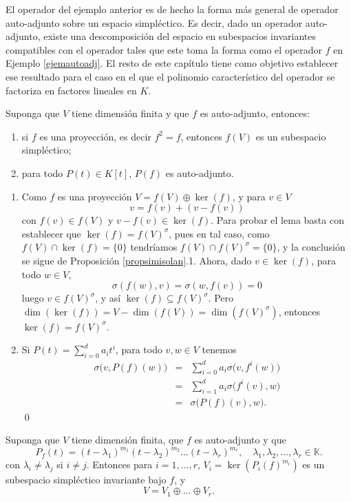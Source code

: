 \begin{obs}
El operador del ejemplo anterior es de hecho la forma m\'as general de operador auto-adjunto sobre un espacio simpl\'ectico. Es decir, dado un operador auto-adjunto, existe una descomposici\'on del espacio en subespacios invariantes compatibles con el operador tales que este toma la forma como el operador $f$ en Ejemplo \ref{ejemautoadj}. El resto de este cap\'itulo tiene como objetivo establecer ese resultado para el caso en el que el polinomio caracter\'istico del operador se factoriza en factores lineales en $K$.
\end{obs}

\begin{lema}
Suponga que $V$ tiene dimensi\'on finita y que $f$ es auto-adjunto, entonces:
\begin{enumerate}
\item si $f$ es una proyecci\'on, es decir $f^2=f$, entonces $f(V)$ es un subespacio simpl\'ectico;
\item para todo $P(t)\in K[t]$, $P(f)$ es auto-adjunto.
\end{enumerate}
\end{lema}

\dem 
\begin{enumerate}
\item Como $f$ es una proyecci\'on $V=f(V)\oplus\ker(f)$, y para $v\in V$
\[
v=f(v)+(v-f(v))
\]
con $f(v)\in f(V)$ y $v-f(v)\in\ker(f)$. Para probar el lema basta con establecer que $\ker(f)=f(V)^\sigma$, pues en tal caso, como $f(V)\cap\ker(f)=\{0\}$ tendr\'iamos $f(V)\cap f(V)^\sigma=\{0\}$, y la conclusi\'on se sigue de Proposici\'on \ref{propsimisolan}.1. Ahora, dado $v\in\ker(f)$, para todo $w\in V$,
\[
\sigma(f(w),v)=\sigma(w,f(v))=0
\]
luego $v\in f(V)^\sigma$, y as\'i $\ker(f)\subseteq f(V)^\sigma$. Pero $\dim(\ker(f))=V-\dim(f(V))=\dim(f(V)^\sigma)$, entonces $\ker(f)=f(V)^\sigma$.
\item Si $P(t)=\sum_{i=0}^da_it^i$, para todo $v,w\in V$ tenemos
\begin{eqnarray*}
\sigma\big(v,P(f)(w)\big) & = & \sum_{i=0}^da_i\sigma\big(v,f^i(w)\big)\\
  & = & \sum_{i=1}^da_i\sigma\big(f^i(v),w\big)\\
  & = & \sigma\big(P(f)(v),w\big).
\end{eqnarray*}\qed
\end{enumerate}

\begin{prop}
Suponga que $V$ tiene dimensi\'on finita, que $f$ es auto-adjunto y que
\[
P_f(t)=(t-\lambda_1)^{m_1}(t-\lambda_2)^{m_2}\ldots(t-\lambda_r)^{m_r}, \quad \lambda_1,\lambda_2,\ldots,\lambda_r\in \mathbb{K}.
\]
con $\lambda_i\ne \lambda_j$ si $i\ne j$. Entonces para $i=1,\ldots,r$, $V_i=\ker(P_i(f)^{m_i})$ es un subespacio simpl\'ectico invariante bajo $f$, y
\[
V=V_1\oplus\ldots\oplus V_r.
\]
\end{prop}


